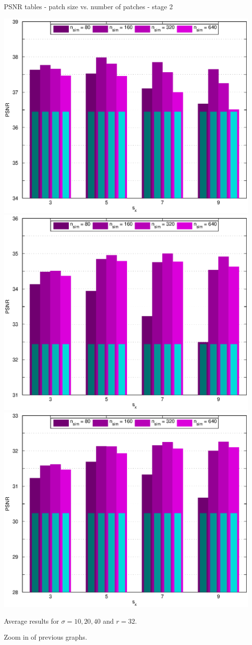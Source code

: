 \documentclass[mathserif, 8pt]{beamer}
\begin{document}
\begin{frame}{PSNR tables - patch size vs. number of patches - stage 2}
	\begin{center}
		\includegraphics[width=.33\textwidth]{zoom_psnr_px2-np2-bars_2r32_s10_average.eps}%
		\includegraphics[width=.33\textwidth]{zoom_psnr_px2-np2-bars_2r32_s20_average.eps}%
		\includegraphics[width=.33\textwidth]{zoom_psnr_px2-np2-bars_2r32_s40_average.eps}
	\end{center}
	\begin{center}
	Average results for $\sigma = 10, 20, 40$ and $r = 32$. 
	\bigskip
	
	Zoom in of previous graphs.
	\end{center}
\end{frame}
\end{document}
